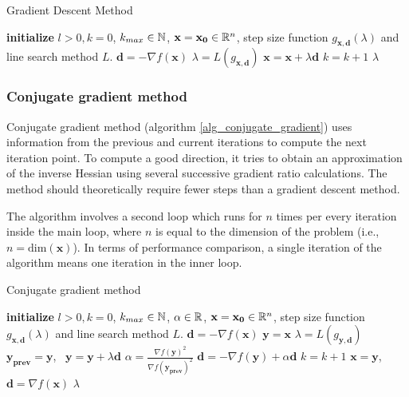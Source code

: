 \documentclass[english, 12pt, a4paper, sci, utf8, a-1b, online, table]{aaltothesis}
\newcommand{\vect}[1]{\ensuremath{\mathbf{#1}}}
\newcommand{\norm}[1]{\ensuremath\Vert #1 \Vert}
\newcommand{\R}{\ensuremath\mathbb{R}}
\newcommand{\N}{\ensuremath\mathbb{N}}
\begin{document}
\begin{algorithm}[H]
\caption{Gradient Descent Method}
\label{alg_gradient_descent}
\begin{algorithmic}[1]
\STATE \textbf{initialize} $l > 0, k = 0$, $k_{max} \in \N$, $\vect{x} = \vect{x_0} \in \R^n$, step size function $g_{\vect{x}, \vect{d}}(\lambda)$ and line search method $L$.
\WHILE{$\norm{\nabla f(\vect{x})} > l$ \AND $k < k_{max}$}
    \STATE $\vect{d} = -\nabla f(\vect{x})$
    \STATE $\lambda = L(g_{\vect{x}, \vect{d}})$
    \STATE $\vect{x} = \vect{x} + \lambda \vect{d}$
    \STATE $k = k + 1$
\ENDWHILE
\RETURN $\lambda$
\end{algorithmic}
\end{algorithm}


\subsubsection{Conjugate gradient method}


Conjugate gradient method (algorithm \ref{alg_conjugate_gradient}) uses information from the previous and current iterations to compute the next iteration point. To compute a good direction, it tries to obtain an approximation of the inverse Hessian using several successive gradient ratio calculations. The method should theoretically require fewer steps than a gradient descent method. \cite{book:introduction_continuous_optimization}

The algorithm involves a second loop which runs for $n$ times per every iteration inside the main loop, where $n$ is equal to the dimension of the problem (i.e., $n = \mathrm{dim}(\vect{x})$). In terms of performance comparison, a single iteration of the algorithm means one iteration in the inner loop.

\begin{algorithm}[H]
\caption{Conjugate gradient method}
\label{alg_conjugate_gradient}
\begin{algorithmic}[1]
\STATE \textbf{initialize} $l > 0, k = 0$, $k_{max} \in \N$, $\alpha \in \R$, $\vect{x} = \vect{x_0} \in \R^n$, step size function $g_{\vect{x}, \vect{d}}(\lambda)$ and line search method $L$.
\STATE $\vect{d} = -\nabla f(\vect{x})$
\WHILE{$\norm{\nabla f(\vect{x})} > l$ \AND $k < k_{max}$}
    \STATE $\vect{y} = \vect{x}$
        \STATE $\lambda = L(g_{\vect{y}, \vect{d}})$
        \STATE $\vect{y_{prev}} = \vect{y}$, \ $\vect{y} = \vect{y} + \lambda \vect{d}$
        \STATE $\alpha = \frac{\nabla f(\vect{y})^2}{\nabla f(\vect{y_{prev}})^2}$
        \STATE $\vect{d} = -\nabla f(\vect{y}) + \alpha \vect{d}$
        \STATE $k = k + 1$
    \ENDFOR
    \STATE $\vect{x} = \vect{y}$, \ $\vect{d} = \nabla f(\vect{x})$
\ENDWHILE
\RETURN $\lambda$
\end{algorithmic}
\end{algorithm}
\end{document}
